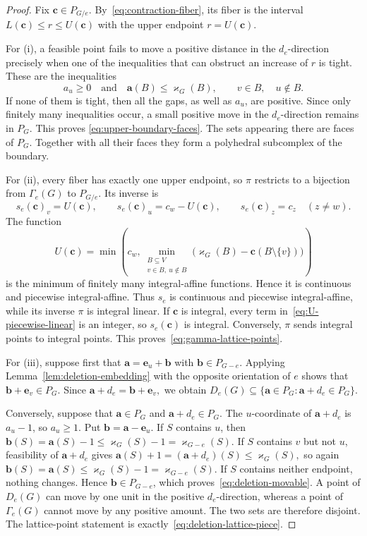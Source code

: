 \documentclass[11pt]{article}
\theoremstyle{plain}
\theoremstyle{definition}
\newcommand{\ba}{\mathbf{a}}
\newcommand{\bb}{\mathbf{b}}
\newcommand{\bc}{\mathbf{c}}
\newcommand{\be}{\mathbf{e}}
\newcommand{\kp}{\varkappa}
\numberwithin{equation}{section}
\begin{document}
\begin{proof}
Fix $\bc\in P_{G/e}$.  By~\eqref{eq:contraction-fiber}, its fiber is the interval
$L(\bc)\le r\le U(\bc)$ with the upper endpoint  $r=U(\bc)$.

For (i), a feasible point fails to move a positive distance in the
$d_e$-direction precisely when one of the inequalities that can obstruct an
increase of $r$ is tight.  These are the inequalities
\[
  a_u\ge 0 \quad \text{and} \quad  \ba(B)\le\kp_G(B),
   \qquad v\in B,\quad u\notin B.
\]
If none of them is tight, then all the gaps, as well as $a_u$, are positive.
Since only finitely many inequalities occur, a small positive move in the $d_e$-direction remains in $P_G$.
This proves \eqref{eq:upper-boundary-faces}.  The sets appearing there are faces of $P_G$.
Together with all their faces they form a polyhedral subcomplex of the boundary.

For (ii), every fiber has exactly one upper endpoint, so $\pi$ restricts
to a bijection from $\Gamma_e(G)$ to $P_{G/e}$.  Its inverse is
\begin{equation}
 s_e(\bc)_v=U(\bc),\qquad
 s_e(\bc)_u=c_w-U(\bc),\qquad
 s_e(\bc)_z=c_z\quad(z\ne w).
\label{eq:maximal-section}
\end{equation}
The function
\begin{equation}
 U(\bc)=\min\!\left(
 c_w,
 \min_{\substack{B\subseteq V\\v\in B,\ u\notin B}}
 \bigl(\kp_G(B)-\bc(B\setminus\{v\})\bigr)
 \right)
\label{eq:U-piecewise-linear}
\end{equation}
is the minimum of finitely many integral-affine functions.  Hence it is continuous and piecewise integral-affine.
Thus $s_e$ is continuous and piecewise integral-affine, while its inverse $\pi$ is integral linear.
If $\bc$ is integral, every term in~\eqref{eq:U-piecewise-linear} is an integer, so $s_e(\bc)$ is integral.
Conversely, $\pi$ sends integral points to integral points.  This proves~\eqref{eq:gamma-lattice-points}.

For (iii), suppose first that $\ba=\be_u+\bb$ with $\bb\in P_{G-e}$.
Applying Lemma~\ref{lem:deletion-embedding} with the opposite orientation of $e$ shows that $\bb+\be_v\in P_G$.
Since  $ \ba+d_e=\bb+\be_v, $
we obtain $D_e(G)\subseteq\{\ba\in P_G:\ba+d_e\in P_G\}$.

Conversely, suppose that $\ba\in P_G$ and $\ba+d_e\in P_G$.  The $u$-coordinate
of $\ba+d_e$ is $a_u-1$, so $a_u\ge 1$.  Put $\bb=\ba-\be_u$.  If $S$ contains $u$,
then  $\bb(S)=\ba(S)-1\le\kp_G(S)-1=\kp_{G-e}(S).$
If $S$ contains $v$ but not $u$, feasibility of $\ba+d_e$ gives
  $\ba(S)+1=(\ba+d_e)(S)\le\kp_G(S),$
so again  $\bb(S)=\ba(S)\le\kp_G(S)-1=\kp_{G-e}(S).$
If $S$ contains neither endpoint, nothing changes.  Hence $\bb\in P_{G-e}$,
which proves~\eqref{eq:deletion-movable}.  A point of $D_e(G)$ can move by one
unit in the positive $d_e$-direction, whereas a point of $\Gamma_e(G)$ cannot
move by any positive amount.  The two sets are therefore disjoint.  The
lattice-point statement is exactly~\eqref{eq:deletion-lattice-piece}.


\end{proof}
\end{document}
